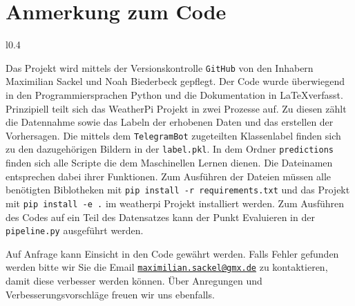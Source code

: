 \newpage
\section{Anmerkung zum Code}
\label{sec:06_code_anhang}
\begin{wrapfigure}{l}{0.4\textwidth}
\vspace{-1cm}
\end{wrapfigure}
Das Projekt wird mittels der Versionskontrolle \texttt{GitHub} von den Inhabern
Maximilian Sackel
und Noah Biederbeck gepflegt. 
Der Code wurde überwiegend in den Programmiersprachen Python und die
Dokumentation in \LaTeX verfasst.
Prinzipiell teilt sich das WeatherPi Projekt in zwei Prozesse auf. 
Zu diesen zählt die Datennahme sowie das Labeln der erhobenen Daten und das
erstellen der Vorhersagen.
Die mittels dem \texttt{TelegramBot} zugeteilten Klassenlabel finden sich zu den
dazugehörigen Bildern in der \texttt{label.pkl}.
In dem Ordner \texttt{predictions} finden sich alle Scripte die dem Maschinellen
Lernen dienen.
Die Dateinamen entsprechen dabei ihrer Funktionen.
Zum Ausführen der Dateien müssen alle benötigten Biblotheken mit 
\verb|pip install -r requirements.txt| und das Projekt mit 
\verb|pip install -e .| im weatherpi Projekt installiert werden. 
Zum Ausführen des Codes auf ein Teil des Datensatzes kann der Punkt Evaluieren
in der \texttt{pipeline.py} ausgeführt werden.

Auf Anfrage kann Einsicht in den Code gewährt werden.
Falls Fehler gefunden werden bitte wir Sie die Email
\href{mailto:maximilian.sackel@gmx.de}{\texttt{maximilian.sackel@gmx.de}} zu 
kontaktieren, damit diese verbesser werden können.
Über Anregungen und Verbesserungsvorschläge freuen wir uns ebenfalls.
